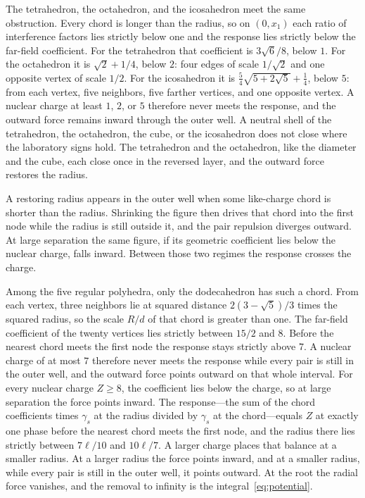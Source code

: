 \documentclass[a4paper]{article}
\begin{document}
The tetrahedron, the octahedron, and the icosahedron meet the same obstruction. Every chord is longer than the radius, so on \((0,x_1)\) each ratio of interference factors lies strictly below one and the response lies strictly below the far-field coefficient. For the tetrahedron that coefficient is \(3\sqrt{6}/8\), below \(1\). For the octahedron it is \(\sqrt{2}+1/4\), below \(2\): four edges of scale \(1/\sqrt{2}\) and one opposite vertex of scale \(1/2\). For the icosahedron it is \(\frac54\sqrt{5+2\sqrt{5}}+\frac14\), below \(5\): from each vertex, five neighbors, five farther vertices, and one opposite vertex. A nuclear charge at least \(1\), \(2\), or \(5\) therefore never meets the response, and the outward force remains inward through the outer well. A neutral shell of the tetrahedron, the octahedron, the cube, or the icosahedron does not close where the laboratory signs hold. The tetrahedron and the octahedron, like the diameter and the cube, each close once in the reversed layer, and the outward force restores the radius.

A restoring radius appears in the outer well when some like-charge chord is shorter than the radius. Shrinking the figure then drives that chord into the first node while the radius is still outside it, and the pair repulsion diverges outward. At large separation the same figure, if its geometric coefficient lies below the nuclear charge, falls inward. Between those two regimes the response crosses the charge.

Among the five regular polyhedra, only the dodecahedron has such a chord. From each vertex, three neighbors lie at squared distance \(2(3-\sqrt{5})/3\) times the squared radius, so the scale \(R/d\) of that chord is greater than one. The far-field coefficient of the twenty vertices lies strictly between \(15/2\) and \(8\). Before the nearest chord meets the first node the response stays strictly above \(7\). A nuclear charge of at most \(7\) therefore never meets the response while every pair is still in the outer well, and the outward force points outward on that whole interval. For every nuclear charge \(Z\ge 8\), the coefficient lies below the charge, so at large separation the force points inward. The response---the sum of the chord coefficients times \(\gamma_s\) at the radius divided by \(\gamma_s\) at the chord---equals \(Z\) at exactly one phase before the nearest chord meets the first node, and the radius there lies strictly between \(7\ell/10\) and \(10\ell/7\). A larger charge places that balance at a smaller radius. At a larger radius the force points inward, and at a smaller radius, while every pair is still in the outer well, it points outward. At the root the radial force vanishes, and the removal to infinity is the integral~\eqref{eq:potential}.
\end{document}
